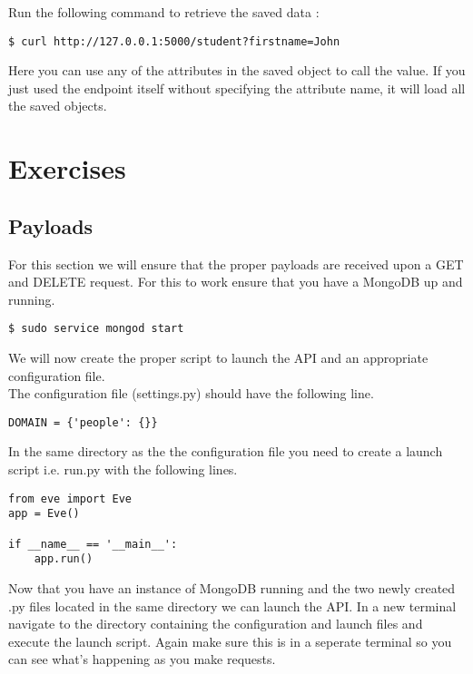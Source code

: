 \documentclass{article}
\begin{document}
Run the following command to retrieve the saved data :

\begin{verbatim}
$ curl http://127.0.0.1:5000/student?firstname=John
\end{verbatim}



\newline

Here you can use any of the attributes in the saved object to call the value. If you just used the endpoint itself without specifying the attribute name, it will load all the saved objects. 

\section{Exercises}
\subsection{Payloads}
For this section we will ensure that the proper payloads are received upon a GET and DELETE request. For this to work ensure that you have a MongoDB up and running.
\begin{verbatim}
$ sudo service mongod start
\end{verbatim}

We will now create the proper script to launch the API and an appropriate configuration file. \\
The configuration file (settings.py) should have the following line.
\begin{verbatim}
DOMAIN = {'people': {}}
\end{verbatim}

In the same directory as the the configuration file you need to create a launch script i.e. run.py with the following lines.

\begin{verbatim}
from eve import Eve
app = Eve()

if __name__ == '__main__':
    app.run()
\end{verbatim}

Now that you have an instance of MongoDB running and the two newly created .py files located in the same directory we can launch the API. In a new terminal navigate to the directory containing the configuration and launch files and execute the launch script. Again make sure this is in a seperate terminal so you can see what's happening as you make requests. 
\end{document}
